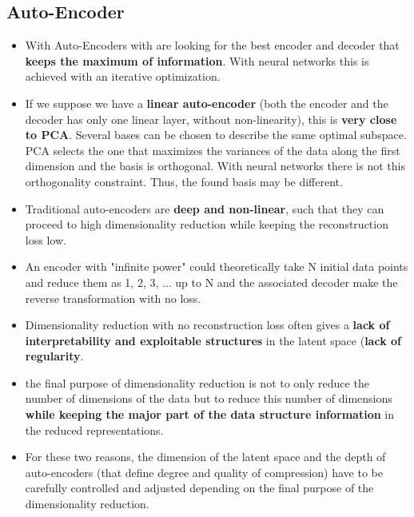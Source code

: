 \subsection{Auto-Encoder}
\begin{itemize}
    \item With Auto-Encoders with are looking for the best encoder and decoder that \textbf{keeps the maximum of information}. With neural networks this is achieved with an iterative optimization.
    \item If we suppose we have a \textbf{linear auto-encoder} (both the encoder and the decoder has only one linear layer, without non-linearity), this is \textbf{very close to PCA}. Several bases can be chosen to describe the same optimal subspace. PCA selects the one that maximizes the variances of the data along the first dimension and the basis is orthogonal. With neural networks there is not this orthogonality constraint. Thus, the found basis may be different.
    \item Traditional auto-encoders are \textbf{deep and non-linear}, such that they can proceed to high dimensionality reduction while keeping the reconstruction loss low.
    \item An encoder with "infinite power" could theoretically take N initial data points and reduce them as 1, 2, 3, ... up to N  and the associated decoder make the reverse transformation with no loss.
    \item Dimensionality reduction with no reconstruction loss often gives a \textbf{lack of interpretability and exploitable structures} in the latent space (\textbf{lack of regularity}.
    \item the final purpose of dimensionality reduction is not to only reduce the number of dimensions of the data but to reduce this number of dimensions \textbf{while keeping the major part of the data structure information} in the reduced representations.
    \item For these two reasons, the dimension of the latent space and the depth of auto-encoders (that define degree and quality of compression) have to be carefully controlled and adjusted depending on the final purpose of the dimensionality reduction.
\end{itemize}




